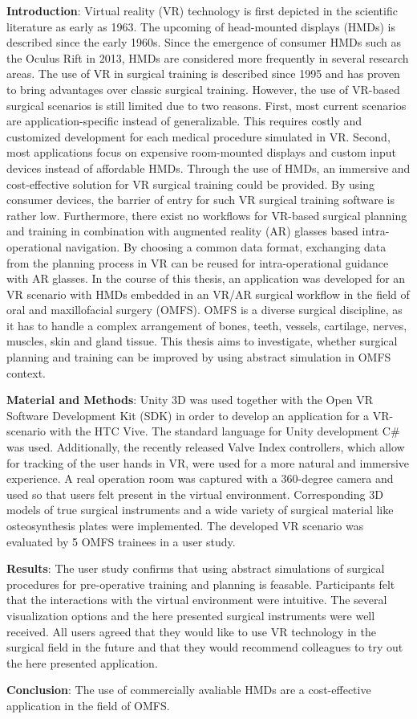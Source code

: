\textbf{Introduction}: Virtual reality (VR) technology is first depicted in the scientific literature as early as 1963.
The upcoming of head-mounted displays (HMDs) is described since the early 1960s.
Since the emergence of consumer HMDs such as the Oculus Rift in 2013, HMDs are considered more frequently in several research areas.
The use of VR in surgical training is described since 1995 and has proven to bring advantages over classic surgical training.
However, the use of VR-based surgical scenarios is still limited due to two reasons.
First, most current scenarios are application-specific instead of generalizable.
This requires costly and customized development for each medical procedure simulated in VR.
Second, most applications focus on expensive room-mounted displays and custom input devices instead of affordable HMDs.
Through the use of HMDs, an immersive and cost-effective solution for VR surgical training could be provided.
By using consumer devices, the barrier of entry for such VR surgical training software is rather low.
Furthermore, there exist no workflows for VR-based surgical planning and training in combination with augmented reality (AR) glasses based intra-operational navigation.
By choosing a common data format, exchanging data from the planning process in VR can be reused for intra-operational guidance with AR glasses.
In the course of this thesis, an application was developed for an VR scenario with HMDs embedded in an VR/AR surgical workflow in 
the field of oral and maxillofacial surgery (OMFS).
OMFS is a diverse surgical discipline, as it has to handle 
a complex arrangement of bones, teeth, vessels, cartilage, nerves, muscles,
skin and gland tissue. This thesis aims to investigate,
whether surgical planning and training can be improved by using
abstract simulation in OMFS context.

\textbf{Material and Methods}: Unity 3D was used together with the Open VR Software Development Kit (SDK) in order to develop an application for a VR-scenario with the HTC Vive.
The standard language for Unity development C\# was used. 
Additionally, the recently released Valve Index controllers, which allow for tracking of the user hands in VR, were used for a more natural and immersive experience.
A real operation room was captured with a 360-degree camera and used so that users felt present in the virtual environment.
Corresponding 3D models of true surgical instruments and a wide variety of surgical material like osteosynthesis plates were implemented.
The developed VR scenario was evaluated by 5 OMFS trainees in a user study.

\textbf{Results}: The user study confirms that using abstract simulations of surgical procedures for pre-operative training and planning is feasable.
Participants felt that the interactions with the virtual environment were intuitive.
The several visualization options and the here presented surgical instruments were well received.
All users agreed that they would like to use VR technology in the surgical field in the future and that they would recommend colleagues to try out the here presented
application. 

\textbf{Conclusion}: The use of commercially avaliable HMDs are a cost-effective application in the field of OMFS.